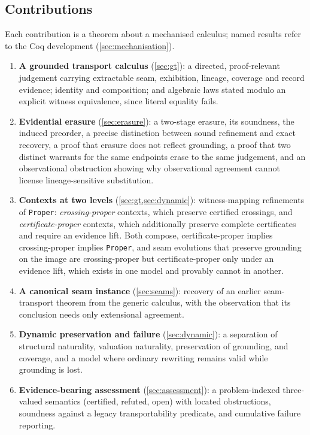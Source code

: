 \subsection{Contributions}
Each contribution is a theorem about a mechanised calculus; named results refer to the Coq development (\cref{sec:mechanisation}).
\begin{enumerate}
\item \textbf{A grounded transport calculus} (\cref{sec:gt}): a directed, proof-relevant judgement carrying extractable seam, exhibition, lineage, coverage and record evidence; identity and composition; and algebraic laws stated modulo an explicit witness equivalence, since literal equality fails.
\item \textbf{Evidential erasure} (\cref{sec:erasure}): a two-stage erasure, its soundness, the induced preorder, a precise distinction between sound refinement and exact recovery, a proof that erasure does not reflect grounding, a proof that two distinct warrants for the same endpoints erase to the same judgement, and an observational obstruction showing why observational agreement cannot license lineage-sensitive substitution.
\item \textbf{Contexts at two levels} (\cref{sec:gt,sec:dynamic}): witness-mapping refinements of \texttt{Proper}: \emph{crossing-proper} contexts, which preserve certified crossings, and \emph{certificate-proper} contexts, which additionally preserve complete certificates and require an evidence lift. Both compose, certificate-proper implies crossing-proper implies \texttt{Proper}, and seam evolutions that preserve grounding on the image are crossing-proper but certificate-proper only under an evidence lift, which exists in one model and provably cannot in another.
\item \textbf{A canonical seam instance} (\cref{sec:seams}): recovery of an earlier seam-transport theorem from the generic calculus, with the observation that its conclusion needs only extensional agreement.
\item \textbf{Dynamic preservation and failure} (\cref{sec:dynamic}): a separation of structural naturality, valuation naturality, preservation of grounding, and coverage, and a model where ordinary rewriting remains valid while grounding is lost.
\item \textbf{Evidence-bearing assessment} (\cref{sec:assessment}): a problem-indexed three-valued semantics (certified, refuted, open) with located obstructions, soundness against a legacy transportability predicate, and cumulative failure reporting.

\end{enumerate}

